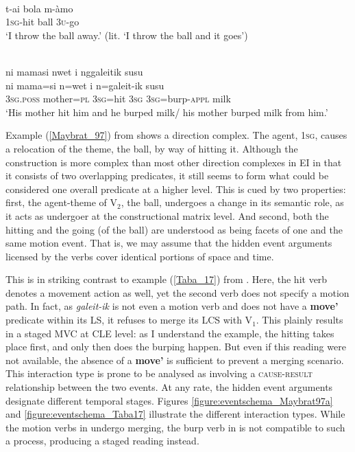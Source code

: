 \ea \label{Maybrat_97} 
\\
\gll t-ai bola m-àmo \\
1\textsc{sg}-hit ball 3\textsc{u}-go \\
\glft `I throw the ball away.' (lit. `I throw the ball and it goes') \\ 
\z

\ea \label{Taba_17}
\\
\glll ni mamasi nwet i nggaleitik susu \\
ni mama=si n=wet i n=galeit-ik susu \\
3\textsc{sg}.\textsc{poss} mother=\textsc{pl} 3\textsc{sg}=hit 3\textsc{sg} 3\textsc{sg}=burp-\textsc{appl} milk\\
\glft `His mother hit him and he burped milk/ his mother burped milk from him.'\\ 
\z

Example (\ref{Maybrat_97}) from  shows a direction complex. The agent, 1\textsc{sg}, causes a relocation of the theme, the ball, by way of hitting it. Although the construction is more complex than most other direction complexes in EI in that it consists of two overlapping predicates, it still seems to form what could be considered one overall predicate at a higher level. This is cued by two properties: first, the agent-theme of V$_2$, the ball, undergoes a change in its semantic role, as it acts as undergoer at the constructional matrix level. And second, both the hitting and the going (of the ball) are understood as being facets of one and the same motion event. That is, we may assume that the hidden event arguments licensed by the verbs cover identical portions of space and time. 

This is in striking contrast to example (\ref{Taba_17}) from . Here, the hit verb denotes a movement action as well, yet the second verb does not specify a motion path. In fact, as \textit{galeit-ik} is not even a motion verb and does not have a \textbf{move'} predicate within its LS, it refuses to merge its LCS with V$_1$. This plainly results in a staged MVC at CLE level: as I understand the example, the hitting takes place first, and only then does the burping happen. But even if this reading were not available, the absence of a \textbf{move'} is sufficient to prevent a merging scenario. This interaction type is prone to be analysed as involving a \textsc{cause-result} relationship between the two events. At any rate, the hidden event arguments designate different temporal stages. Figures \ref{figure:eventschema_Maybrat97a} and \ref{figure:eventschema_Taba17} illustrate the different interaction types. While the motion verbs in  undergo merging, the burp verb in  is not compatible to such a process, producing a staged reading instead.

